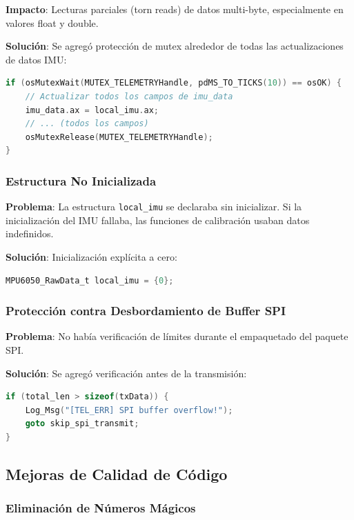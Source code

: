 \documentclass[11pt,a4paper]{article}
\begin{document}
\textbf{Impacto}: Lecturas parciales (torn reads) de datos multi-byte, especialmente en valores float y double.

\textbf{Solución}: Se agregó protección de mutex alrededor de todas las actualizaciones de datos IMU:

\begin{lstlisting}[language=C]
if (osMutexWait(MUTEX_TELEMETRYHandle, pdMS_TO_TICKS(10)) == osOK) {
    // Actualizar todos los campos de imu_data
    imu_data.ax = local_imu.ax;
    // ... (todos los campos)
    osMutexRelease(MUTEX_TELEMETRYHandle);
}
\end{lstlisting}

\subsubsection{Estructura No Inicializada}

\textbf{Problema}: La estructura \texttt{local\_imu} se declaraba sin inicializar. Si la inicialización del IMU fallaba, las funciones de calibración usaban datos indefinidos.

\textbf{Solución}: Inicialización explícita a cero:
\begin{lstlisting}[language=C]
MPU6050_RawData_t local_imu = {0};
\end{lstlisting}

\subsubsection{Protección contra Desbordamiento de Buffer SPI}

\textbf{Problema}: No había verificación de límites durante el empaquetado del paquete SPI.

\textbf{Solución}: Se agregó verificación antes de la transmisión:
\begin{lstlisting}[language=C]
if (total_len > sizeof(txData)) {
    Log_Msg("[TEL_ERR] SPI buffer overflow!");
    goto skip_spi_transmit;
}
\end{lstlisting}

\subsection{Mejoras de Calidad de Código}

\subsubsection{Eliminación de Números Mágicos}
\end{document}
